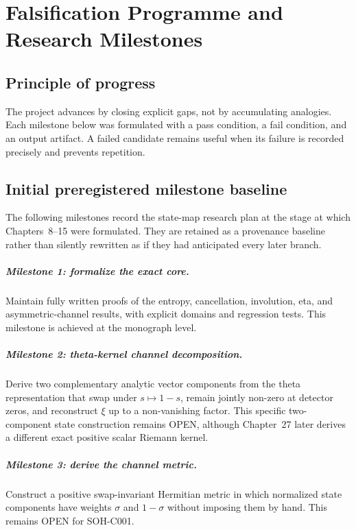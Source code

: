 \chapter{Falsification Programme and Research Milestones}
\label{chap:falsification}

\section{Principle of progress}

The project advances by closing explicit gaps, not by accumulating analogies. Each milestone below was formulated with a pass condition, a fail condition, and an output artifact. A failed candidate remains useful when its failure is recorded precisely and prevents repetition.

\section{Initial preregistered milestone baseline}

The following milestones record the state-map research plan at the stage at which Chapters~8--15 were formulated. They are retained as a provenance baseline rather than silently rewritten as if they had anticipated every later branch.

\paragraph{Milestone 1: formalize the exact core.}
Maintain fully written proofs of the entropy, cancellation, involution, eta, and asymmetric-channel results, with explicit domains and regression tests. This milestone is achieved at the monograph level.

\paragraph{Milestone 2: theta-kernel channel decomposition.}
Derive two complementary analytic vector components from the theta representation that swap under $s\mapsto1-s$, remain jointly non-zero at detector zeros, and reconstruct $\xi$ up to a non-vanishing factor. This specific two-component state construction remains OPEN, although Chapter~27 later derives a different exact positive scalar Riemann kernel.

\paragraph{Milestone 3: derive the channel metric.}
Construct a positive swap-invariant Hermitian metric in which normalized state components have weights $\sigma$ and $1-\sigma$ without imposing them by hand. This remains OPEN for SOH-C001.

